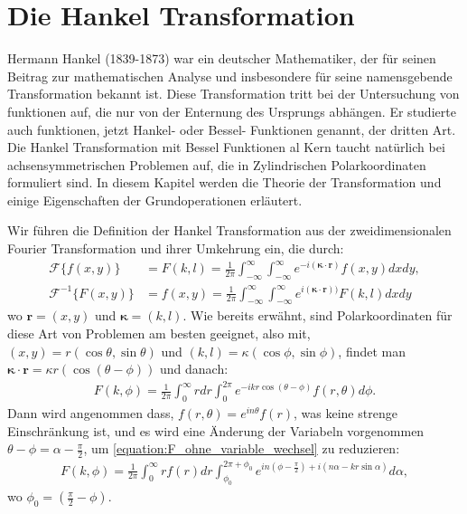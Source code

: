 %
%

\section{Die Hankel Transformation \label{kreismembran:section:teil2}}

Hermann Hankel (1839-1873) war ein deutscher Mathematiker, der für seinen Beitrag zur mathematischen Analyse und insbesondere für seine namensgebende Transformation bekannt ist.
Diese Transformation tritt bei der Untersuchung von funktionen auf, die nur von der Enternung des Ursprungs abhängen.
Er studierte auch funktionen, jetzt Hankel- oder Bessel- Funktionen genannt, der dritten Art.
Die Hankel Transformation mit Bessel Funktionen al Kern taucht natürlich bei achsensymmetrischen Problemen auf, die in Zylindrischen Polarkoordinaten formuliert sind.
In diesem Kapitel werden die Theorie der Transformation und einige Eigenschaften der Grundoperationen erläutert.


Wir führen die Definition der Hankel Transformation aus der zweidimensionalen Fourier Transformation und ihrer Umkehrung ein, die durch:
\begin{align}
	\mathscr{F}\{f(x,y)\} & = F(k,l)=\frac{1}{2\pi}\int_{-\infty}^{\infty}\int_{-\infty}^{\infty}e^{-i( \bm{\kappa}\cdot \mathbf{r})}f(x,y) dx dy,\label{equation:fourier_transform}\\
	\mathscr{F}^{-1}\{F(x,y)\} & = f(x,y)=\frac{1}{2\pi}\int_{-\infty}^{\infty}\int_{-\infty}^{\infty}e^{i(\bm{\kappa}\cdot \mathbf{r}))}F(k,l) dx dy \label{equation:inv_fourier_transform}
\end{align}
wo $\mathbf{r}=(x,y)$ und $\bm{\kappa}=(k,l)$. Wie bereits erwähnt, sind Polarkoordinaten für diese Art von Problemen am besten geeignet, also mit, $(x,y)=r(\cos\theta,\sin\theta)$ und $(k,l)=\kappa(\cos\phi,\sin\phi)$, findet man $\bm{\kappa}\cdot\mathbf{r}=\kappa r(\cos(\theta-\phi))$ und danach:
\begin{align}
	F(k,\phi)=\frac{1}{2\pi}\int_{0}^{\infty}r dr \int_{0}^{2\pi}e^{-ikr\cos(\theta-\phi)}f(r,\theta) d\phi.
	\label{equation:F_ohne_variable_wechsel}
\end{align}
Dann wird angenommen dass, $f(r,\theta)=e^{in\theta}f(r)$, was keine strenge Einschränkung ist, und es wird eine Änderung der Variabeln vorgenommen $\theta-\phi=\alpha-\frac{\pi}{2}$, um \eqref{equation:F_ohne_variable_wechsel} zu reduzieren:
\begin{align}
	F(k,\phi)=\frac{1}{2\pi}\int_{0}^{\infty}rf(r) dr \int_{\phi_{0}}^{2\pi+\phi_{0}}e^{in(\phi-\frac{\pi}{2})+i(n\alpha-kr\sin\alpha)} d\alpha,
	\label{equation:F_ohne_bessel}
\end{align}
wo $\phi_{0}=(\frac{\pi}{2}-\phi)$.

